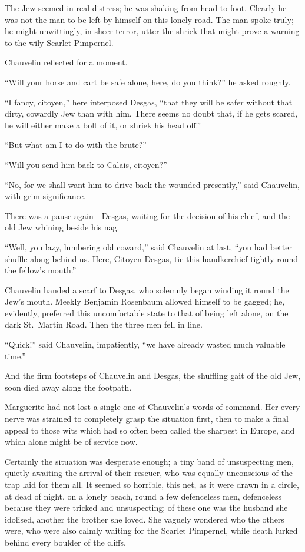 \documentclass[paper=5.5in:8.5in,BCOR=7mm,twoside,DIV=calc,12pt,usegeometry,chapterprefix,endperiod,headings=big]{scrbook}
\begin{document}
The Jew seemed in real distress; he was shaking from head to foot. Clearly he was not the man to be left by himself on this lonely road. The man spoke truly; he might unwittingly, in sheer terror, utter the shriek that might prove a warning to the wily Scarlet Pimpernel.

Chauvelin reflected for a moment.

\enquote{Will your horse and cart be safe alone, here, do you think?} he asked roughly.

\enquote{I fancy, citoyen,} here interposed Desgas, \enquote{that they will be safer without that dirty, cowardly Jew than with him. There seems no doubt that, if he gets scared, he will either make a bolt of it, or shriek his head off.}

\enquote{But what am I to do with the brute?}

\enquote{Will you send him back to Calais, citoyen?}

\enquote{No, for we shall want him to drive back the wounded presently,} said Chauvelin, with grim significance.

There was a pause again---Desgas, waiting for the decision of his chief, and the old Jew whining beside his nag.

\enquote{Well, you lazy, lumbering old coward,} said Chauvelin at last, \enquote{you had better shuffle along behind us. Here, Citoyen Desgas, tie this handkerchief tightly round the fellow's mouth.}

Chauvelin handed a scarf to Desgas, who solemnly began winding it round the Jew's mouth. Meekly Benjamin Rosenbaum allowed himself to be gagged; he, evidently, preferred this uncomfortable state to that of being left alone, on the dark St.~Martin Road. Then the three men fell in line.

\enquote{Quick!} said Chauvelin, impatiently, \enquote{we have already wasted much valuable time.}

And the firm footsteps of Chauvelin and Desgas, the shuffling gait of the old Jew, soon died away along the footpath.

Marguerite had not lost a single one of Chauvelin's words of command. Her every nerve was strained to completely grasp the situation first, then to make a final appeal to those wits which had so often been called the sharpest in Europe, and which alone might be of service now.

Certainly the situation was desperate enough; a tiny band of unsuspecting men, quietly awaiting the arrival of their rescuer, who was equally unconscious of the trap laid for them all. It seemed so horrible, this net, as it were drawn in a circle, at dead of night, on a lonely beach, round a few defenceless men, defenceless because they were tricked and unsuspecting; of these one was the husband she idolised, another the brother she loved. She vaguely wondered who the others were, who were also calmly waiting for the Scarlet Pimpernel, while death lurked behind every boulder of the cliffs.
\end{document}
